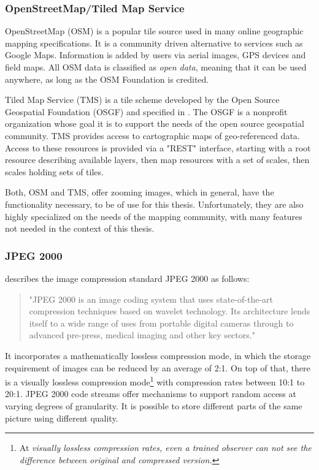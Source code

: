 \subsubsection{OpenStreetMap/Tiled Map Service}
OpenStreetMap (OSM) is a popular tile source used in many online geographic mapping specifications\cite{web:openseadragon}. It is a community driven alternative to services such as Google Maps. Information is added by users via aerial images, GPS devices and field maps. All OSM data is classified as \emph{open data}, meaning that it can be used anywhere, as long as the OSM Foundation is credited\cite{web:osm}.

Tiled Map Service (TMS) is a tile scheme developed by the Open Source Geospatial Foundation (OSGF)\cite{web:openseadragon} and specified in \cite{web:tms}. The OSGF is a nonprofit organization whose goal it is to support the needs of the open source geospatial community. TMS provides access to cartographic maps of geo-referenced data. Access to these resources is provided via a "REST" interface, starting with a root resource describing available layers, then map resources with a set of scales, then scales holding sets of tiles\cite{web:tms}.

Both, OSM and TMS, offer zooming images, which in general, have the functionality necessary, to be of use for this thesis. Unfortunately, they are also highly specialized on the needs of the mapping community, with many features not needed in the context of this thesis.


\subsubsection{JPEG 2000}
\cite{web:jpeg2000} describes the image compression standard JPEG 2000 as follows:
\begin{quotation}
	"JPEG 2000 is an image coding system that uses state-of-the-art compression techniques based on wavelet technology. Its architecture lends itself to a wide range of uses from portable digital cameras through to advanced pre-press, medical imaging and other key sectors."
\end{quotation}

It incorporates a mathematically lossless compression mode, in which the storage requirement of images can be reduced by an average of 2:1. On top of that, there is a visually lossless compression mode\footnote{At \emph{visually lossless compression rates, even a trained observer can not see the difference between original and compressed version\cite{intoPix08}.}} with compression rates between 10:1 to 20:1\cite{intoPix08}. JPEG 2000 code streams offer mechanisms to support random access at varying degrees of granularity. It is possible to store different parts of the same picture using different quality\cite{Taubmann01}. 

